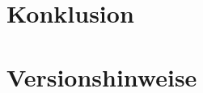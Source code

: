 \documentclass[12pt]{article}
\begin{document}
\section{Konklusion}



\section{Versionshinweise}




%
\end{document}
